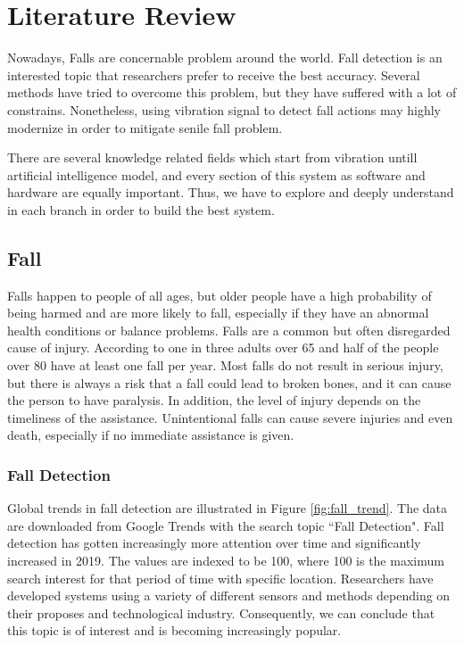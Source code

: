\setlength{\parindent}{0in}
\setlength{\parskip}{1em}
\setlength{\baselineskip}{1.6em}


\chapter{Literature Review}
\label{ch:literature-review}


Nowadays, Falls are concernable problem around the world. Fall detection is an interested topic that researchers prefer to receive the best accuracy. Several methods have tried to overcome this problem, but they have suffered with a lot of constrains. Nonetheless, using vibration signal to detect fall actions may highly modernize in order to mitigate senile fall problem.


There are several knowledge related fields which start from vibration untill artificial intelligence model, and every section of this system as software and hardware are equally important. Thus, we have to explore and deeply understand in each branch in order to build the best system.


\section{Fall}
\label{Fall}

Falls happen to people of all ages, but older people have a high probability of being  harmed and are more likely to fall, especially if they have an abnormal health conditions or balance problems. Falls are a common but often disregarded cause of injury. According to \citeauthor{nhs_2019} \citeyear{nhs_2019} one in three adults over 65 and half of the people over 80 have at least one fall per year. Most falls do not result in serious injury, but there is always a risk that a fall could lead to broken bones, and it can cause the person to have paralysis. In addition, the level of injury depends on the timeliness of the assistance. Unintentional falls can cause severe injuries and even death, especially if no immediate assistance is given.

\subsection{Fall Detection}

Global trends in fall detection are illustrated in Figure \ref{fig:fall_trend}. The data are downloaded from Google Trends with the search topic ``Fall Detection". Fall detection has gotten increasingly more attention over time and significantly increased in 2019. The values are indexed to be 100, where 100 is the maximum search interest for that period of time with specific location. Researchers have developed systems using a variety of different sensors and methods depending on their proposes and technological industry. Consequently, we can conclude that this topic is of interest and is becoming increasingly popular.


